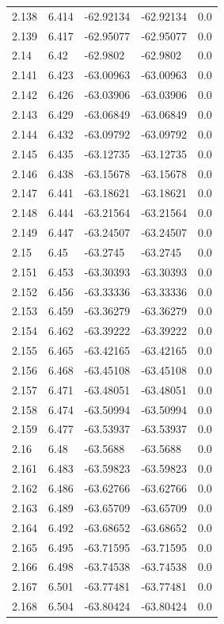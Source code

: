\begin{tabular}{lllll}
2.138 & 6.414 & -62.92134 & -62.92134 & 0.0 \\
2.139 & 6.417 & -62.95077 & -62.95077 & 0.0 \\
2.14 & 6.42 & -62.9802 & -62.9802 & 0.0 \\
2.141 & 6.423 & -63.00963 & -63.00963 & 0.0 \\
2.142 & 6.426 & -63.03906 & -63.03906 & 0.0 \\
2.143 & 6.429 & -63.06849 & -63.06849 & 0.0 \\
2.144 & 6.432 & -63.09792 & -63.09792 & 0.0 \\
2.145 & 6.435 & -63.12735 & -63.12735 & 0.0 \\
2.146 & 6.438 & -63.15678 & -63.15678 & 0.0 \\
2.147 & 6.441 & -63.18621 & -63.18621 & 0.0 \\
2.148 & 6.444 & -63.21564 & -63.21564 & 0.0 \\
2.149 & 6.447 & -63.24507 & -63.24507 & 0.0 \\
2.15 & 6.45 & -63.2745 & -63.2745 & 0.0 \\
2.151 & 6.453 & -63.30393 & -63.30393 & 0.0 \\
2.152 & 6.456 & -63.33336 & -63.33336 & 0.0 \\
2.153 & 6.459 & -63.36279 & -63.36279 & 0.0 \\
2.154 & 6.462 & -63.39222 & -63.39222 & 0.0 \\
2.155 & 6.465 & -63.42165 & -63.42165 & 0.0 \\
2.156 & 6.468 & -63.45108 & -63.45108 & 0.0 \\
2.157 & 6.471 & -63.48051 & -63.48051 & 0.0 \\
2.158 & 6.474 & -63.50994 & -63.50994 & 0.0 \\
2.159 & 6.477 & -63.53937 & -63.53937 & 0.0 \\
2.16 & 6.48 & -63.5688 & -63.5688 & 0.0 \\
2.161 & 6.483 & -63.59823 & -63.59823 & 0.0 \\
2.162 & 6.486 & -63.62766 & -63.62766 & 0.0 \\
2.163 & 6.489 & -63.65709 & -63.65709 & 0.0 \\
2.164 & 6.492 & -63.68652 & -63.68652 & 0.0 \\
2.165 & 6.495 & -63.71595 & -63.71595 & 0.0 \\
2.166 & 6.498 & -63.74538 & -63.74538 & 0.0 \\
2.167 & 6.501 & -63.77481 & -63.77481 & 0.0 \\
2.168 & 6.504 & -63.80424 & -63.80424 & 0.0 \\

\end{tabular}

